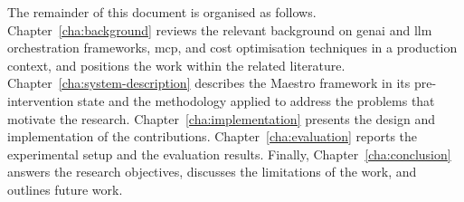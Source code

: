 The remainder of this document is organised as follows.
Chapter~\ref{cha:background} reviews the relevant background on \gls{genai} and \gls{llm} orchestration frameworks, \gls{mcp}, and cost optimisation techniques in a production context, and positions the work within the related literature.
Chapter~\ref{cha:system-description} describes the Maestro framework in its pre-intervention state and the methodology applied to address the problems that motivate the research.
Chapter~\ref{cha:implementation} presents the design and implementation of the contributions.
Chapter~\ref{cha:evaluation} reports the experimental setup and the evaluation results.
Finally, Chapter~\ref{cha:conclusion} answers the research objectives, discusses the limitations of the work, and outlines future work.
